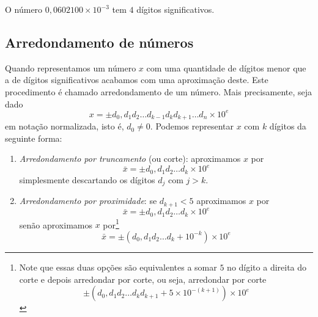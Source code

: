 \begin{ex} O número $0,0602100\times 10^{-3}$ tem $4$ dígitos significativos.
\end{ex}

\subsection{Arredondamento de números}

Quando representamos um número $x$ com uma quantidade de dígitos menor que a de dígitos significativos acabamos com uma aproximação deste. Este procedimento é chamado arredondamento de um número. Mais precisamente, seja dado
\begin{equation*}
  x = \pm d_0,d_1d_2\ldots d_{k-1}d_kd_{k+1}\ldots d_n \times 10^e
\end{equation*}
em notação normalizada, isto é, $d_0\neq 0$. Podemos representar $x$ com $k$ dígitos da seguinte forma:
\begin{enumerate}
\item \emph{Arredondamento por truncamento} (ou corte): aproximamos $x$ por
$$
  \bar{x} = \pm d_{0},d_{1}d_{2}\ldots d_{k}\times 10^e
$$
simplesmente descartando os dígitos $d_{j}$ com $j > k$.
\item \emph{Arredondamento por proximidade}: se $d_{k+1}<5$ aproximamos $x$ por
$$
  \bar{x} = \pm d_0,d_1d_2\ldots d_{k}\times 10^{e}
$$
senão aproximamos $x$ por\footnote{Note que essas duas opções são equivalentes a somar $5$ no dígito a direita do corte e depois arredondar por corte, ou seja, arredondar por corte 
$$ \pm(d_0,d_1d_2\ldots d_kd_{k+1}+ 5 \times10^{-(k+1)} )\times 10^{e} $$}
$$
 \bar{x} = \pm(d_0,d_1d_2\ldots d_{k} + 10^{-k}) \times 10^{e}
$$
\end{enumerate}

